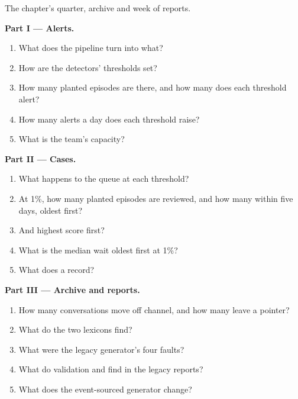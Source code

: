 \begin{problem}\label{pb:pl:surveillance-and-compliance-technology:1}
The chapter's quarter, archive and week of reports.

\medskip\noindent\textbf{Part I --- Alerts.}
\begin{enumerate}
\item What does the pipeline turn into what?
\item How are the detectors' thresholds set?
\item How many planted episodes are there, and how many does each threshold alert?
\item How many alerts a day does each threshold raise?
\item What is the team's capacity?
\end{enumerate}

\medskip\noindent\textbf{Part II --- Cases.}
\begin{enumerate}[resume]
\item What happens to the queue at each threshold?
\item At 1\%, how many planted episodes are reviewed, and how many within five days, oldest first?
\item And highest score first?
\item What is the median wait oldest first at 1\%?
\item What does a  record?
\end{enumerate}

\medskip\noindent\textbf{Part III --- Archive and reports.}
\begin{enumerate}[resume]
\item How many conversations move off channel, and how many leave a pointer?
\item What do the two lexicons find?
\item What were the legacy generator's four faults?
\item What do validation and  find in the legacy reports?
\item What does the event-sourced generator change?
\end{enumerate}


\end{problem}
